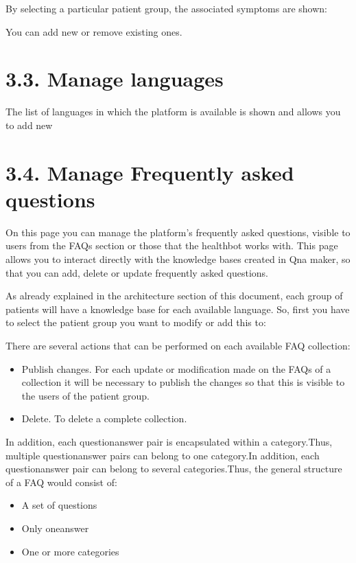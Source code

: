 \documentclass[letterpaper,10pt,english]{sphinxmanual}
\begin{document}
By selecting a particular patient group, the associated symptoms are shown:



You can add new or remove existing ones.


\section{3.3. Manage languages}
\label{\detokenize{pages/Superadmin profile:manage-languages}}
The list of languages in which the platform is available is shown and allows you to add new




\section{3.4. Manage Frequently asked questions}
\label{\detokenize{pages/Superadmin profile:manage-frequently-asked-questions}}
On this page you can manage the platform’s frequently asked questions, visible to users from the FAQs section or those that the healthbot works with.
This page allows you to interact directly with the knowledge bases created in Qna maker, so that you can add, delete or update frequently asked questions.



As already explained in the architecture section of this document, each group of patients will have a knowledge base for each available language. So, first you have to select the patient group you want to modify or add this to:



There are several actions that can be performed on each available FAQ collection:
\begin{itemize}
\item {} 
Publish changes. For each update or modification made on the FAQs of a collection it will be necessary to publish the changes so that this is visible to the users of the patient group.

\item {} 
Delete. To delete a complete collection.

\end{itemize}

In addition, each question\sphinxhyphen{}answer pair is encapsulated within a category.Thus, multiple question\sphinxhyphen{}answer  pairs  can  belong  to  one  category.In  addition,  each  question\sphinxhyphen{}answer pair can belong to several categories.Thus, the general structure of a FAQ would consist of:
\begin{itemize}
\item {} 
A set of questions

\item {} 
Only oneanswer

\item {} 
One or more categories

\end{itemize}
\end{document}
